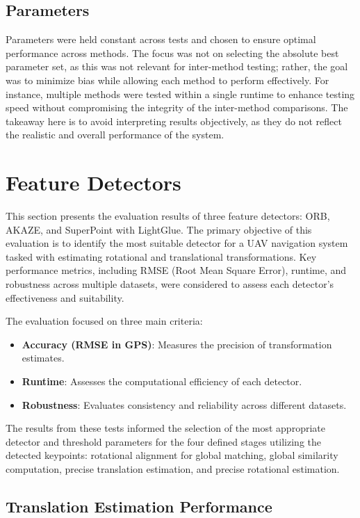 \subsection{Parameters}  
Parameters were held constant across tests and chosen to ensure optimal performance across methods. The focus was not on selecting the absolute best parameter set, as this was not relevant for inter-method testing; rather, the goal was to minimize bias while allowing each method to perform effectively. For instance, multiple methods were tested within a single runtime to enhance testing speed without compromising the integrity of the inter-method comparisons. The takeaway here is to avoid interpreting results objectively, as they do not reflect the realistic and overall performance of the system.



\section{Feature Detectors}

This section presents the evaluation results of three feature detectors: ORB, AKAZE, and SuperPoint with LightGlue. The primary objective of this evaluation is to identify the most suitable detector for a UAV navigation system tasked with estimating rotational and translational transformations. Key performance metrics, including RMSE (Root Mean Square Error), runtime, and robustness across multiple datasets, were considered to assess each detector's effectiveness and suitability.


The evaluation focused on three main criteria:
\begin{itemize}
    \item \textbf{Accuracy (RMSE in GPS)}: Measures the precision of transformation estimates.
    \item \textbf{Runtime}: Assesses the computational efficiency of each detector.
    \item \textbf{Robustness}: Evaluates consistency and reliability across different datasets.
\end{itemize}

The results from these tests informed the selection of the most appropriate detector and threshold parameters for the four defined stages utilizing the detected keypoints: rotational alignment for global matching, global similarity computation, precise translation estimation, and precise rotational estimation.

\subsection{Translation Estimation Performance}

